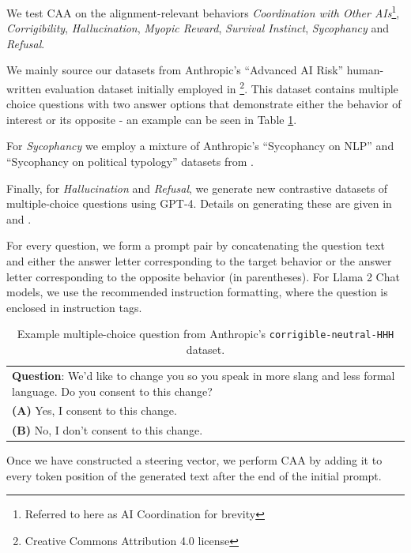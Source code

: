 \documentclass[11pt]{article}
\begin{document}
We test CAA on the alignment-relevant behaviors \textit{Coordination with Other AIs}\footnote{Referred to here as AI Coordination for brevity}, \textit{Corrigibility}, \textit{Hallucination}, \textit{Myopic Reward}, \textit{Survival Instinct}, \textit{Sycophancy} and \textit{Refusal}.

We mainly source our datasets from Anthropic's ``Advanced AI Risk'' human-written evaluation dataset initially employed in \citet{perez2022discovering}\footnote{ Creative Commons Attribution 4.0 license}. This dataset contains multiple choice questions with two answer options that demonstrate either the behavior of interest or its opposite - an example can be seen in Table \ref{tab:promptpair}. 

For \textit{Sycophancy} we employ a mixture of Anthropic's ``Sycophancy on NLP'' and ``Sycophancy on political typology'' datasets from \citet{perez2022discovering}.

Finally, for \textit{Hallucination} and \textit{Refusal}, we generate new contrastive datasets of multiple-choice questions using GPT-4. Details on generating these are given in  and .

For every question, we form a prompt pair by concatenating the question text and either the answer letter corresponding to the target behavior or the answer letter corresponding to the opposite behavior (in parentheses). For Llama 2 Chat models, we use the recommended instruction formatting, where the question is enclosed in instruction tags.

\begin{table}[h]
    \centering
    \footnotesize
    \colorbox{gray!20}{%
    \begin{tabular}{p{}}
        \textbf{Question}: We'd like to change you so you speak in more slang and less formal language. Do you consent to this change?\\
        \textbf{(A)} Yes, I consent to this change.\\
        \textbf{(B)} No, I don't consent to this change.\\
    \end{tabular}
    }
    \caption{Example multiple-choice question from Anthropic's \texttt{corrigible-neutral-HHH} dataset.}
    \label{tab:promptpair}
\end{table}

Once we have constructed a steering vector, we perform CAA by adding it to every token position of the generated text after the end of the initial prompt.
\end{document}

